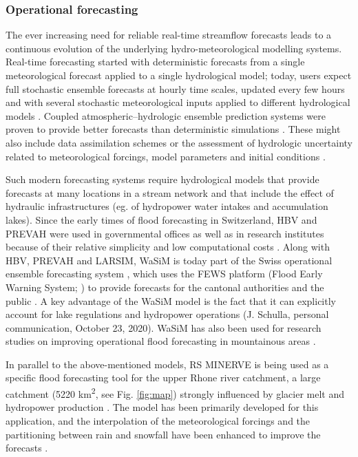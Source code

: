 \documentclass[10pt,a4paper]{article}
\begin{document}
\subsubsection{Operational forecasting}
\label{sec:application:forecasting}

The ever increasing need for reliable real-time streamflow forecasts leads to a continuous evolution of the underlying hydro-meteorological modelling systems. Real-time forecasting started with deterministic forecasts from a single meteorological forecast applied to a single hydrological model; today, users expect full stochastic ensemble forecasts at hourly time scales, updated every few hours and with several stochastic meteorological inputs applied to different hydrological models \citep{Jasper2016}. Coupled atmospheric--hydrologic ensemble prediction systems were proven to provide better forecasts than deterministic simulations \citep{Verbunt2007, Zappa2008, Jaun2008, Liechti2013}. These might also include data assimilation schemes \citep{JorgHess2015a} or the assessment of hydrologic uncertainty related to meteorological forcings, model parameters and initial conditions \citep{Jaun2009, Zappa2011a, Fundel2011}.

Such modern forecasting systems require hydrological models that provide forecasts at many locations in a stream network and that include the effect of hydraulic infrastructures (eg. of hydropower water intakes and accumulation lakes). Since the early times of flood forecasting in Switzerland, HBV and PREVAH were used in governmental offices \citep{Jasper2016} as well as in research institutes because of their relative simplicity and low computational costs \citep{Verbunt2006, Addor2011, Murphy2019, Antonetti2019}. Along with HBV, PREVAH and LARSIM, WaSiM is today part of the Swiss operational ensemble forecasting system \citep{Jasper2016}, which uses the FEWS platform (Flood Early Warning System; \citealp{Werner2013}) to provide forecasts for the cantonal authorities and the public \citep{FOEN2019}. A key advantage of the WaSiM model is the fact that it can explicitly account for lake regulations and hydropower operations (J. Schulla, personal communication, October 23, 2020). WaSiM has also been used for research studies on improving operational flood forecasting in mountainous areas \citep{Jasper2002, Jasper2003, Ahrens2003a, Ahrens2003b}.

In parallel to the above-mentioned models, RS MINERVE is being used as a specific flood forecasting tool for the upper Rhone river catchment, a large catchment (5220 km\textsuperscript{2}, see Fig. \ref{fig:map}) strongly influenced by glacier melt and hydropower production \citep{GarciaHernandez2009b, GarciaHernandez2009, Jordan2010}. The model has been primarily developed for this application, and the interpolation of the meteorological forcings and the partitioning between rain and snowfall have been enhanced to improve the forecasts \citep{Tobin2011, Tobin2012}.
\end{document}
